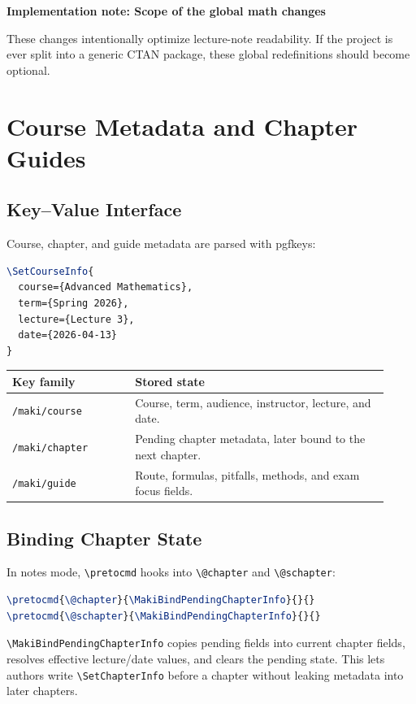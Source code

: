 \documentclass[a4paper,11pt]{ltxdoc}
\newcommand{\mpkg}[1]{\textsf{#1}}
\newcommand{\mcmd}[1]{\texttt{\textbackslash#1}}
\newcommand{\mkey}[1]{\texttt{#1}}
\newenvironment{implementation}[1]
  {\par\medskip\noindent\textbf{\color{MakiBlue}Implementation note: #1}\par\smallskip}
  {\par\medskip}
\begin{document}
\begin{implementation}{Scope of the global math changes}
These changes intentionally optimize lecture-note readability. If the project is
ever split into a generic CTAN package, these global redefinitions should become
optional.
\end{implementation}

\section{Course Metadata and Chapter Guides}

\subsection{Key--Value Interface}

Course, chapter, and guide metadata are parsed with \mpkg{pgfkeys}:

\begin{lstlisting}[language=TeX]
\SetCourseInfo{
  course={Advanced Mathematics},
  term={Spring 2026},
  lecture={Lecture 3},
  date={2026-04-13}
}
\end{lstlisting}

\begin{longtable}{@{}p{0.3\linewidth}p{0.62\linewidth}@{}}
\toprule
Key family & Stored state \\
\midrule
\mkey{/maki/course} & Course, term, audience, instructor, lecture, and date.\\
\mkey{/maki/chapter} & Pending chapter metadata, later bound to the next chapter.\\
\mkey{/maki/guide} & Route, formulas, pitfalls, methods, and exam focus fields.\\
\bottomrule
\end{longtable}

\subsection{Binding Chapter State}

In notes mode, \mcmd{pretocmd} hooks into \mcmd{@chapter} and \mcmd{@schapter}:

\begin{lstlisting}[language=TeX]
\pretocmd{\@chapter}{\MakiBindPendingChapterInfo}{}{}
\pretocmd{\@schapter}{\MakiBindPendingChapterInfo}{}{}
\end{lstlisting}

\mcmd{MakiBindPendingChapterInfo} copies pending fields into current chapter
fields, resolves effective lecture/date values, and clears the pending state.
This lets authors write \mcmd{SetChapterInfo} before a chapter without leaking
metadata into later chapters.
\end{document}
